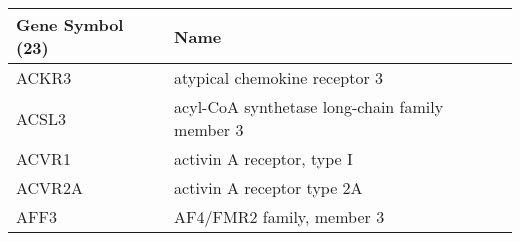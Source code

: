 \begin{tabular}{ll}
\toprule
Gene Symbol (23) &                                           Name \\
\midrule
           ACKR3 &                  atypical chemokine receptor 3 \\
           ACSL3 & acyl-CoA synthetase long-chain family member 3 \\
           ACVR1 &                     activin A receptor, type I \\
          ACVR2A &                     activin A receptor type 2A \\
            AFF3 &                      AF4/FMR2 family, member 3 \\
\bottomrule
\end{tabular}
